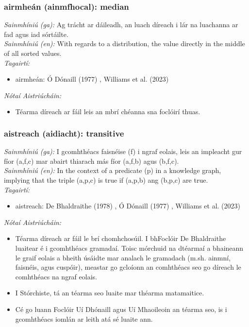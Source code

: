 \subsubsection*{airmheán (ainmfhocal): median}
 \noindent \textit{Sainmhíniú (ga):} Ag trácht ar dáileadh, an luach díreach i lár na luachanna ar fad agus iad sórtáilte.
\\
 \noindent \textit{Sainmhíniú (en):} With regards to a distribution, the value directly in the middle of all sorted values.
\\
 \noindent \textit{Tagairtí:}
\begin{itemize}
	\item airmheán: Ó Dónaill (1977) \cite{odonaill}, Williams et al. (2023) \cite{storchiste}
\end{itemize}

 \noindent \textit{Nótaí Aistriúcháin:}
\begin{itemize}
	\item Téarma díreach ar fáil leis an mbrí chéanna sna foclóirí thuas.
\end{itemize}


\subsubsection*{aistreach (aidiacht): transitive}
 \noindent \textit{Sainmhíniú (ga):} I gcomhthéacs faisnéise (f) i ngraf eolais, leis an impleacht gur fíor (a,f,c) mar abairt thiarach más fíor (a,f,b) agus (b,f,c).
\\
 \noindent \textit{Sainmhíniú (en):} In the context of a predicate (p) in a knowledge graph, implying that the triple (a,p,c) is true if (a,p,b) ang (b,p,c) are true.
\\
 \noindent \textit{Tagairtí:}
\begin{itemize}
	\item aistreach: De Bhaldraithe (1978) \cite{de-bhaldraithe}, Ó Dónaill (1977) \cite{odonaill}, Williams et al. (2023) \cite{storchiste}
\end{itemize}

 \noindent \textit{Nótaí Aistriúcháin:}
\begin{itemize}
	\item Téarma díreach ar fáil le brí chomhchosúil. I bhFoclóir De Bhaldraithe luaitear é i gcomhthéacs gramadaí. Toisc mórchuid na dtéarmaí a bhaineann le graif eolais a bheith úsáidte mar analach le gramadach (m.sh. ainmní, faisnéis, agus cuspóir), meastar go gcloíonn an comhthéacs seo go díreach le comhthéacs na ngraf eolais.
	\item I Stórchiste, tá an téarma seo luaite mar théarma matamaitice.
	\item Cé go luann Foclóir Uí Dhónaill agus Uí Mhaoileoin an téarma seo, is i gcomhthéacs iomlán ar leith atá sé luaite ann.
\end{itemize}


